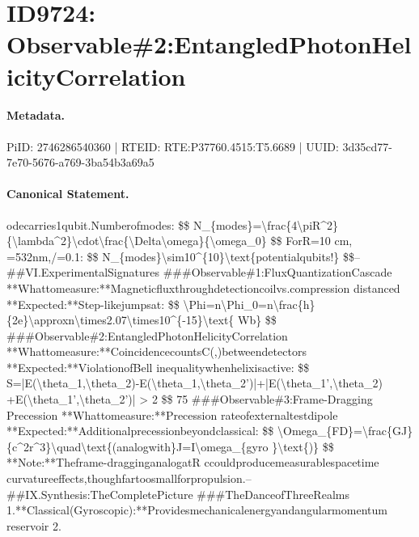 \section*{ID9724: Observable\#2:EntangledPhotonHelicityCorrelation}
\paragraph{Metadata.}
PiID: 2746286540360 | RTEID: RTE:P37760.4515:T5.6689 | UUID: 3d35cd77-7e70-5676-a769-3ba54b3a69a5

\paragraph{Canonical Statement.}
odecarries1qubit.Numberofmodes: \$\$ N\_\{modes\}=\textbackslash{}frac\{4\textbackslash{}piR\textasciicircum{}2\}\{\textbackslash{}lambda\textasciicircum{}2\}\textbackslash{}cdot\textbackslash{}frac\{\textbackslash{}Delta\textbackslash{}omega\}\{\textbackslash{}omega\_0\} \$\$ ForR=10 cm, =532nm,/=0.1: \$\$ N\_\{modes\}\textbackslash{}sim10\textasciicircum{}\{10\}\textbackslash{}text\{potentialqubits!\} \$\$-- \#\#VI.ExperimentalSignatures \#\#\#Observable\#1:FluxQuantizationCascade **Whattomeasure:**Magneticfluxthroughdetectioncoilvs.compression distanced **Expected:**Step-likejumpsat: \$\$ \textbackslash{}Phi=n\textbackslash{}Phi\_0=n\textbackslash{}frac\{h\}\{2e\}\textbackslash{}approxn\textbackslash{}times2.07\textbackslash{}times10\textasciicircum{}\{-15\}\textbackslash{}text\{ Wb\} \$\$ \#\#\#Observable\#2:EntangledPhotonHelicityCorrelation **Whattomeasure:**CoincidencecountsC(,)betweendetectors **Expected:**ViolationofBell inequalitywhenhelixisactive: \$\$ S=|E(\textbackslash{}theta\_1,\textbackslash{}theta\_2)-E(\textbackslash{}theta\_1,\textbackslash{}theta\_2’)|+|E(\textbackslash{}theta\_1’,\textbackslash{}theta\_2) +E(\textbackslash{}theta\_1’,\textbackslash{}theta\_2’)| > 2 \$\$ 75 \#\#\#Observable\#3:Frame-Dragging Precession **Whattomeasure:**Precession rateofexternaltestdipole **Expected:**Additionalprecessionbeyondclassical: \$\$ \textbackslash{}Omega\_\{FD\}=\textbackslash{}frac\{GJ\}\{c\textasciicircum{}2r\textasciicircum{}3\}\textbackslash{}quad\textbackslash{}text\{(analogwith\}J=I\textbackslash{}omega\_\{gyro \}\textbackslash{}text\{)\} \$\$ **Note:**Theframe-dragginganalogatR ccouldproducemeasurablespacetime curvatureeffects,thoughfartoosmallforpropulsion.-- \#\#IX.Synthesis:TheCompletePicture \#\#\#TheDanceofThreeRealms 1.**Classical(Gyroscopic):**Providesmechanicalenergyandangularmomentum reservoir 2.

